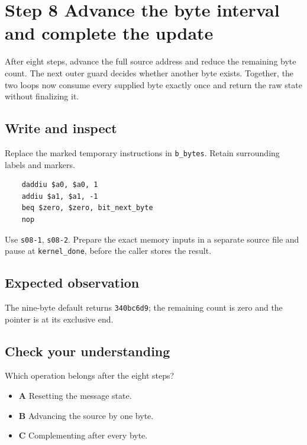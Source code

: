 \section{Step 8 Advance the byte interval and complete the update}\label{crc-s08}

After eight steps, advance the full source address and reduce the remaining byte count. The next outer guard decides whether another byte exists. Together, the two loops now consume every supplied byte exactly once and return the raw state without finalizing it.

\subsection{Write and inspect}
Replace the marked temporary instructions in \texttt{b\_bytes}. Retain surrounding labels and markers.

\begin{verbatim}
    daddiu $a0, $a0, 1
    addiu $a1, $a1, -1
    beq $zero, $zero, bit_next_byte
    nop
\end{verbatim}

Use \texttt{s08-1}, \texttt{s08-2}. Prepare the exact memory inputs in a separate source file and pause at \texttt{kernel\_done}, before the caller stores the result.

\subsection{Expected observation}
The nine-byte default returns \texttt{340bc6d9}; the remaining count is zero and the pointer is at its exclusive end.

\subsection{Check your understanding}
Which operation belongs after the eight steps?

\begin{itemize}
  \item \textbf{A} Resetting the message state.
  \item \textbf{B} Advancing the source by one byte.
  \item \textbf{C} Complementing after every byte.
\end{itemize}
